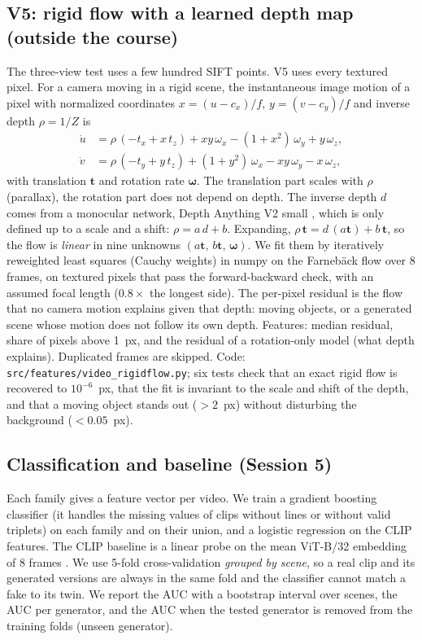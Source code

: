 \documentclass[11pt,a4paper]{article}
\begin{document}
\subsection{V5: rigid flow with a learned depth map (outside the course)}

The three-view test uses a few hundred SIFT points. V5 uses every textured pixel. For a camera
moving in a rigid scene, the instantaneous image motion of a pixel with normalized coordinates
$x=(u-c_x)/f$, $y=(v-c_y)/f$ and inverse depth $\rho=1/Z$ is \cite{longuet1980}
\begin{equation}
\begin{aligned}
\dot u &= \rho\,(-t_x + x\,t_z) + x y\,\omega_x - (1+x^2)\,\omega_y + y\,\omega_z,\\
\dot v &= \rho\,(-t_y + y\,t_z) + (1+y^2)\,\omega_x - x y\,\omega_y - x\,\omega_z ,
\end{aligned}
\end{equation}
with translation $\mathbf t$ and rotation rate $\boldsymbol\omega$. The translation part scales
with $\rho$ (parallax), the rotation part does not depend on depth. The inverse depth $d$ comes
from a monocular network, Depth Anything V2 small \cite{depthanything}, which is only defined up
to a scale and a shift: $\rho=a\,d+b$. Expanding, $\rho\,\mathbf t=d\,(a\mathbf t)+b\,\mathbf t$,
so the flow is \emph{linear} in nine unknowns $(a\mathbf t,\,b\mathbf t,\,\boldsymbol\omega)$.
We fit them by iteratively reweighted least squares (Cauchy weights) in numpy on the
Farneb\"ack flow over 8 frames, on textured pixels that pass the forward-backward check, with an
assumed focal length ($0.8\times$ the longest side). The per-pixel residual is the flow that no
camera motion explains given that depth: moving objects, or a generated scene whose motion
does not follow its own depth. Features: median residual, share of pixels above 1~px, and the
residual of a rotation-only model (what depth explains). Duplicated frames are skipped.
Code: \texttt{src/features/video\_rigidflow.py}; six tests check that an exact rigid flow is
recovered to $10^{-6}$~px, that the fit is invariant to the scale and shift of the depth, and
that a moving object stands out ($>2$~px) without disturbing the background ($<0.05$~px).

\subsection{Classification and baseline (Session 5)}

Each family gives a feature vector per video. We train a gradient boosting classifier (it
handles the missing values of clips without lines or without valid triplets) on each family
and on their union, and a logistic regression on the CLIP features. The CLIP baseline is a
linear probe on the mean ViT-B/32 embedding of 8 frames \cite{radford2021,ojha2023}. We use
5-fold cross-validation \emph{grouped by scene}, so a real clip and its generated versions are
always in the same fold and the classifier cannot match a fake to its twin. We report the
AUC with a bootstrap interval over scenes, the AUC per generator, and the AUC when the
tested generator is removed from the training folds (unseen generator).
\end{document}
